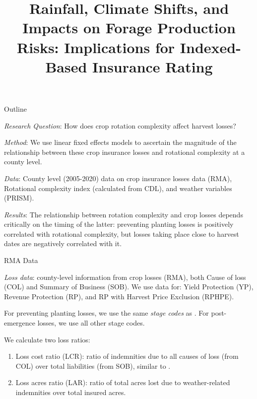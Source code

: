 \documentclass[notes, 11pt, aspectratio=169]{beamer}
\title[]{Rainfall, Climate Shifts, and Impacts on Forage Production Risks: Implications for Indexed-Based Insurance Rating}
\author[VEF]{}
\institute[UARK]{\small{\begin{tabular}{cc}
			Lawson Connor & Victor Funes-Leal & Eunchun Park\\
			\multicolumn{3}{c}{\small Department of Agricultural Economics and Agribusiness}\\ 
			\multicolumn{3}{c}{\small University of Arkansas}\\
\end{tabular}}}
\newenvironment{wideitemize}{\itemize\addtolength{\itemsep}{10pt}}{\enditemize}
\begin{document}
 
\begin{frame}
	\maketitle
	\centering 
\end{frame}

\begin{frame}{Outline}
\begin{wideitemize}
    \item \emph{Research Question}: How does crop rotation complexity affect harvest losses?
    \item \emph{Method}: We use linear fixed effects models to ascertain the magnitude of the relationship between these crop insurance losses and rotational complexity at a county level.
    \item \emph{Data}: County level (2005-2020) data on crop insurance losses data (RMA), Rotational complexity index (calculated from CDL), and weather variables (PRISM).
    \item \emph{Results}: The relationship between rotation complexity and crop losses depends critically on the timing of the latter: preventing planting losses is positively correlated with rotational complexity, but losses taking place close to harvest dates are negatively correlated with it.
\end{wideitemize}
\end{frame}

\begin{frame}{RMA Data}
    \begin{wideitemize}
        \item \emph{Loss data}: county-level information from crop losses (RMA), both Cause of loss (COL) and Summary of Business (SOB). We use data for: Yield Protection (YP), Revenue Protection (RP), and RP with Harvest Price Exclusion (RPHPE). 
        \item For preventing planting losses, we use the same \textit{stage codes} as \cite{won2024}. For post-emergence losses, we use all other stage codes. 
        \item We calculate two loss ratios:
        \begin{enumerate}
            \item Loss cost ratio (LCR): ratio of indemnities due to all causes of loss (from COL) over total liabilities (from SOB), similar to \cite{yu2024}.
            \item Loss acres ratio (LAR): ratio of total acres lost due to weather-related indemnities over total insured acres. 
        \end{enumerate}
    \end{wideitemize}
\end{frame}
\end{document}
